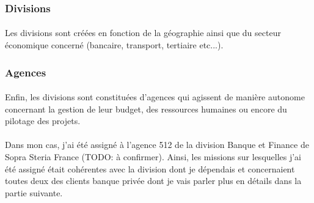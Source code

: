 \subsubsection{Divisions}
\paragraph{}
Les divisions sont créées en fonction de la géographie ainsi que du secteur économique concerné (bancaire, transport, tertiaire etc...).

\subsubsection{Agences}
\paragraph{}
Enfin, les divisions sont constituées d'agences qui agissent de manière autonome concernant la gestion de leur budget, des ressources humaines ou encore du pilotage des projets.

\paragraph{}
Dans mon cas, j'ai été assigné à l'agence 512 de la division Banque et Finance de Sopra Steria France (TODO: à confirmer). Ainsi, les missions sur lesquelles j'ai été assigné était cohérentes avec la division dont je dépendais et concernaient toutes deux des clients banque privée dont je vais parler plus en détails dans la partie suivante.